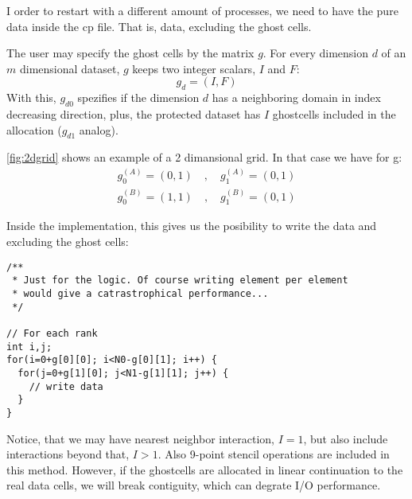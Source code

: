 \documentclass[12pt,a4paper]{amsart}
\numberwithin{equation}{section}
\theoremstyle{plain}
\theoremstyle{definition}
\begin{document}
I order to restart with a different amount of processes, we need to have
the pure data inside the cp file. That is, data, excluding the ghost
cells.

The user may specify the ghost cells by the matrix $g$. For every
dimension $d$ of an $m$ dimensional dataset, $g$ keeps two integer
scalars, $I$ and $F$:
\begin{equation}
g_{d} = (I, F)
\end{equation}
With this, $g_{d0}$ spezifies if the dimension $d$ has a neighboring
domain in
index decreasing direction, plus, the protected
dataset has $I$ ghostcells included in the allocation ($g_{d1}$ analog).

\ref{fig:2dgrid} shows an example of a 2 dimansional grid. In that case
we have for g:
\begin{eqnarray*}
g^{(A)}_0 = (0,1) \quad , \quad g^{(A)}_1 = (0,1) \\
g^{(B)}_0 = (1,1) \quad , \quad g^{(B)}_1 = (0,1)
\end{eqnarray*}

Inside the implementation, this gives us the posibility to write the
data and excluding the ghost cells:

\begin{lstlisting}[style=CStyle]
/**
 * Just for the logic. Of course writing element per element
 * would give a catrastrophical performance...
 */

// For each rank
int i,j;
for(i=0+g[0][0]; i<N0-g[0][1]; i++) {
  for(j=0+g[1][0]; j<N1-g[1][1]; j++) {
    // write data
  }
}
\end{lstlisting} 

Notice, that we may have nearest neighbor interaction, $I=1$, but also
include interactions beyond that, $I > 1$. Also 9-point stencil
operations are included in this method. However, if the ghostcells are
allocated in linear continuation to the real data cells, we will
break contiguity, which can degrate I/O performance.
\end{document}
